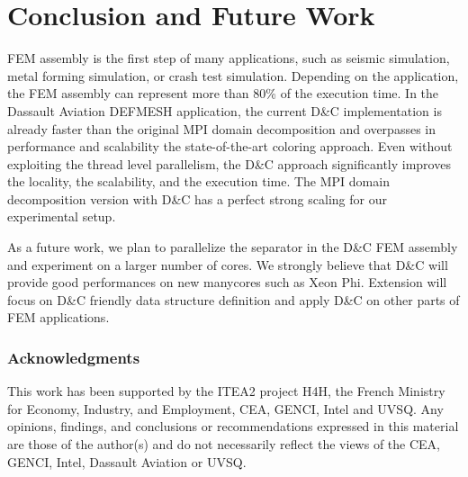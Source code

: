 \documentclass[10pt]{IOS-Book-Article}
\begin{document}

\section{Conclusion and Future Work}
\label{sec:conc}
FEM assembly is the first step of many applications, such as seismic simulation, metal forming simulation, or crash test simulation.
Depending on the application, the FEM assembly can represent more than 80\% of the execution time.
In the Dassault Aviation DEFMESH application, the current D\&C implementation is already faster than the original MPI domain decomposition and overpasses in performance and scalability the state-of-the-art coloring approach.
Even without exploiting the thread level parallelism, the D\&C approach significantly improves the locality, the scalability, and the execution time.
The MPI domain decomposition version with D\&C has a perfect strong scaling for our experimental setup.

As a future work, we plan to parallelize the separator in the D\&C FEM assembly and experiment on a larger number of cores.
We strongly believe that D\&C will provide good performances on new manycores such as Xeon Phi.
Extension will focus on D\&C friendly data structure definition and apply D\&C on other parts of FEM applications. 

\subsubsection*{Acknowledgments} \scriptsize{
This work has been supported by the ITEA2 project H4H, the French Ministry for Economy,
Industry, and Employment, CEA, GENCI, Intel and UVSQ.  Any opinions,
findings, and conclusions or recommendations expressed in this
material are those of the author(s) and do not necessarily reflect the
views of the CEA, GENCI, Intel, Dassault Aviation or UVSQ.}



\end{document}
